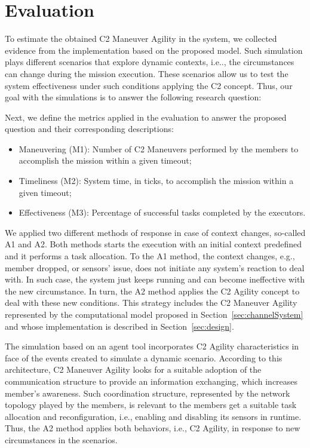 \newpage
\section{Evaluation}
\label{sec:evaluation}

To estimate the obtained C2 Maneuver Agility in the system, we collected evidence from the implementation based on the proposed model. Such simulation plays different scenarios that explore dynamic contexts, i.e.., the circumstances can change during the mission execution. These scenarios allow us to test the system effectiveness under such conditions applying the C2 concept. Thus, our goal with the simulations is to answer the following research question:

\begin{center}
\end{center}

Next, we define the metrics applied in the evaluation to answer the proposed question and their corresponding descriptions:
\begin{itemize}
    \item Maneuvering (M1): Number of C2 Maneuvers performed by the members to accomplish the mission within a given timeout;
    \item Timeliness (M2): System time, in ticks, to accomplish the mission within a given timeout;
    \item Effectiveness (M3): Percentage of successful tasks completed by the executors.
\end{itemize}

We applied two different methods of response in case of context changes, so-called A1 and A2. Both methods starts the execution with an initial context predefined and it performs a task allocation. To the A1 method, the context changes, e.g., member dropped, or sensors' issue, does not initiate any system's reaction to deal with. In such case, the system just keeps running and can become ineffective with the new circumstance. In turn, the A2 method applies the C2 Agility concept to deal with these new conditions. This strategy includes the C2 Maneuver Agility represented by the computational model proposed in Section~\ref{sec:channelSystem} and whose implementation is described in Section~\ref{sec:design}.

The simulation based on an agent tool incorporates C2 Agility characteristics in face of the events created to simulate a dynamic scenario. According to this architecture, C2 Maneuver Agility looks for a suitable adoption of the communication structure to provide an information exchanging, which increases member's awareness. Such coordination structure, represented by the network topology played by the members, is relevant to the members get a suitable task allocation and reconfiguration, i.e., enabling and disabling its sensors in runtime. Thus, the A2 method applies both behaviors, i.e., C2 Agility, in response to new circumstances in the scenarios.

